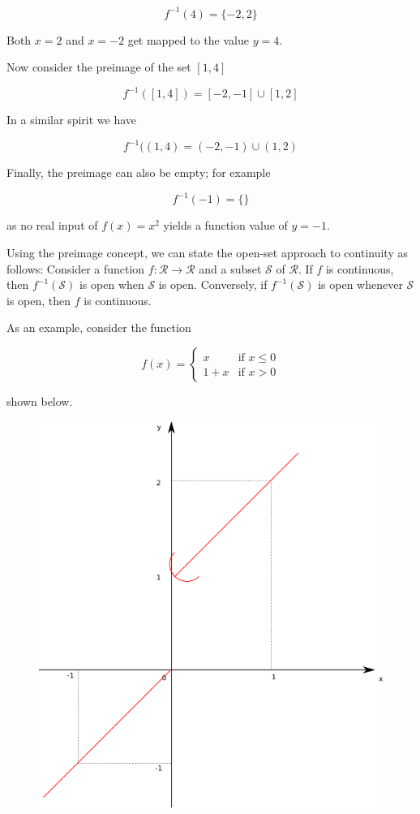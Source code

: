 \[
f^{-1}(4) = \{-2, 2\}
\]

Both \(x=2\) and \(x=-2\) get mapped to the value \(y = 4\).

Now consider the preimage of the set \([1,4]\)

\[
f^{-1}([1,4]) = [-2,-1] \cup [1,2]
\]

In a similar spirit we have

\[
f^{-1}((1,4) = (-2,-1) \cup (1,2)
\]

Finally, the preimage can also be empty; for example

\[
f^{-1}(-1) = \{\}
\]

as no real input of \(f(x) = x^2\) yields a function value of \(y=-1\).

Using the preimage concept, we can state the open-set approach to
continuity as follows: Consider a function
\(f: \mathcal{R} \rightarrow \mathcal{R}\) and a subset \(\mathcal{S}\)
of \(\mathcal{R}\). If \(f\) is continuous, then \(f^{-1}(\mathcal{S})\)
is open when \(\mathcal{S}\) is open. Conversely, if
\(f^{-1}(\mathcal{S})\) is open whenever \(\mathcal{S}\) is open, then
\(f\) is continuous.

As an example, consider the function

\[
f(x) = \begin{cases}
x & \mbox{if } x \leq 0 \\
1+x & \mbox{if } x > 0 \end{cases}
\]

shown below.

\begin{figure}
\includegraphics[scale=0.7]{images/continuity_top_01.png}
\end{figure}

